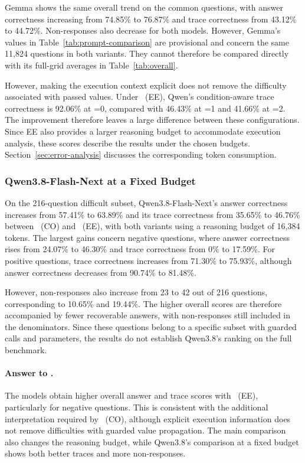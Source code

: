 

Gemma shows the same overall trend on the common questions, with answer correctness increasing from 74.85\% to 76.87\% and trace correctness from 43.12\% to 44.72\%. Non-responses also decrease for both models. However, Gemma's values in Table~\ref{tab:prompt-comparison} are provisional and concern the same 11,824 questions in both variants. They cannot therefore be compared directly with its full-grid averages in Table~\ref{tab:overall}.

However, making the execution context explicit does not remove the difficulty associated with passed values. Under \benchmark~(EE), Qwen's condition-aware trace correctness is 92.06\% at =0, compared with 46.43\% at =1 and 41.66\% at =2. The improvement therefore leaves a large difference between these configurations. Since EE also provides a larger reasoning budget to accommodate execution analysis, these scores describe the results under the chosen budgets. Section~\ref{sec:error-analysis} discusses the corresponding token consumption.

\subsubsection{Qwen3.8-Flash-Next at a Fixed Budget}

On the 216-question difficult subset, Qwen3.8-Flash-Next's answer correctness increases from 57.41\% to 63.89\% and its trace correctness from 35.65\% to 46.76\% between \benchmark~(CO) and \benchmark~(EE), with both variants using a reasoning budget of 16,384 tokens. The largest gains concern negative questions, where answer correctness rises from 24.07\% to 46.30\% and trace correctness from 0\% to 17.59\%. For positive questions, trace correctness increases from 71.30\% to 75.93\%, although answer correctness decreases from 90.74\% to 81.48\%.

However, non-responses also increase from 23 to 42 out of 216 questions, corresponding to 10.65\% and 19.44\%. The higher overall scores are therefore accompanied by fewer recoverable answers, with non-responses still included in the denominators. Since these questions belong to a specific subset with guarded calls and parameters, the results do not establish Qwen3.8's ranking on the full benchmark.

\paragraph{Answer to .}
The models obtain higher overall answer and trace scores with \benchmark~(EE), particularly for negative questions. This is consistent with the additional interpretation required by \benchmark~(CO), although explicit execution information does not remove difficulties with guarded value propagation. The main comparison also changes the reasoning budget, while Qwen3.8's comparison at a fixed budget shows both better traces and more non-responses.
